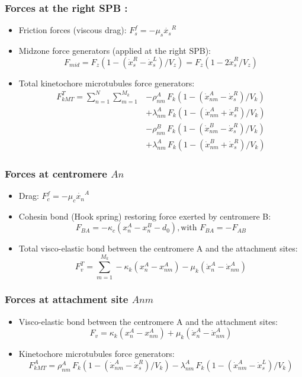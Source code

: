 \documentclass[a4paper,12pt]{article}
\begin{document}
\subsubsection{Forces at the right SPB :}
\begin{itemize}
\item Friction forces (viscous drag):  $F_s^f = -\mu_s \dot{x_s}^R$
\item Midzone force generators (applied at the right SPB): 
  $$F_{mid} = F_z\left(1 - (\dot{x}^R_s - \dot{x}_s^L)/V_z\right) =
  F_z\left(1 - 2\dot{x}^R_s / V_z\right) $$
\item Total kinetochore microtubules force generators:
$$  \begin{aligned}
    F_{kMT}^T = \sum_{n = 1}^{N}\sum_{m = 1}^{M_k} & - \rho_{nm}^A\,F_k\left( 1 -
      (\dot{x}^A_{nm} - \dot{x}^R_s)/V_k\right)\\
    & + \lambda_{nm}^A\,F_k\left(1 -
      (\dot{x}^A_{nm} + \dot{x}^R_s)/V_k\right)\\
    & - \rho_{nm}^B\,F_k\left( 1 -
      (\dot{x}^B_{nm} - \dot{x}^R_s)/V_k\right)\\
    & + \lambda_{nm}^A\,F_k\left(1 -
      (\dot{x}^B_{nm} + \dot{x}^R_s)/V_k\right)
  \end{aligned}
$$
\end{itemize}

\subsubsection{Forces at centromere $An$}

\begin{itemize}
\item Drag: $F_c^f = -\mu_c \dot{x_n}^A$
\item Cohesin bond (Hook spring) restoring force exerted by centromere
  B: $$F_{BA} = -\kappa_c (x_n^A - x_n^B - d_0),
  \mbox{with } F_{BA} = - F_{AB}$$
\item Total visco-elastic bond between the centromere A and the attachment
  sites:
  $$ F_v^T = \sum_{m = 1}^{M_k} -\kappa_k(x_n^A - x_{nm}^A) 
  - \mu_k(\dot{x}_n^A - \dot{x}_{nm}^A) $$
\end{itemize}

\subsubsection{Forces at attachment site $Anm$}

\begin{itemize}
\item Visco-elastic bond between the centromere A and the
  attachment sites:
  $$F_v =  \kappa_k(x_n^A - x_{nm}^A) 
  + \mu_k(\dot{x}_n^A - \dot{x}_{nm}^A) $$
\item Kinetochore microtubules force generators:
  $$F_{kMT}^A = \rho_{nm}^A\,F_k\left(1 - (\dot{x}^A_{nm} -
    \dot{x}^R_s)/V_k\right) - \lambda_{nm}^A\,F_k\left(1 -
    (\dot{x}^A_{nm} - \dot{x}^L_s)/V_k\right) $$
\end{itemize}
\end{document}
